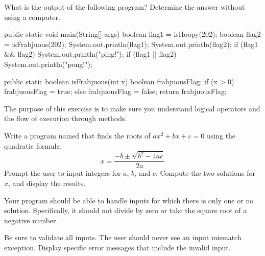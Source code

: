 \begin{exercise}  %

What is the output of the following program?
Determine the answer without using a computer.

\begin{code}
public static void main(String[] args) {
    boolean flag1 = isHoopy(202);
    boolean flag2 = isFrabjuous(202);
    System.out.println(flag1);
    System.out.println(flag2);
    if (flag1 && flag2) {
        System.out.println("ping!");
    }
    if (flag1 || flag2) {
        System.out.println("pong!");
    }
}
\end{code}


\begin{code}
public static boolean isFrabjuous(int x) {
    boolean frabjuousFlag;
    if (x > 0) {
        frabjuousFlag = true;
    } else {
        frabjuousFlag = false;
    }
    return frabjuousFlag;
}
\end{code}

The purpose of this exercise is to make sure you understand logical operators and the flow of execution through methods.

\end{exercise}


\begin{exercise}  %

Write a program named  that finds the roots of $ax^2 + bx + c = 0$ using the quadratic formula:
$$ x = \frac{-b \pm \sqrt{b^2 - 4ac}}{2a} $$
Prompt the user to input integers for $a$, $b$, and $c$.
Compute the two solutions for $x$, and display the results.

Your program should be able to handle inputs for which there is only one or no solution.
Specifically, it should not divide by zero or take the square root of a negative number.

Be sure to validate all inputs.
The user should never see an input mismatch exception.
Display specific error messages that include the invalid input.

\end{exercise}


